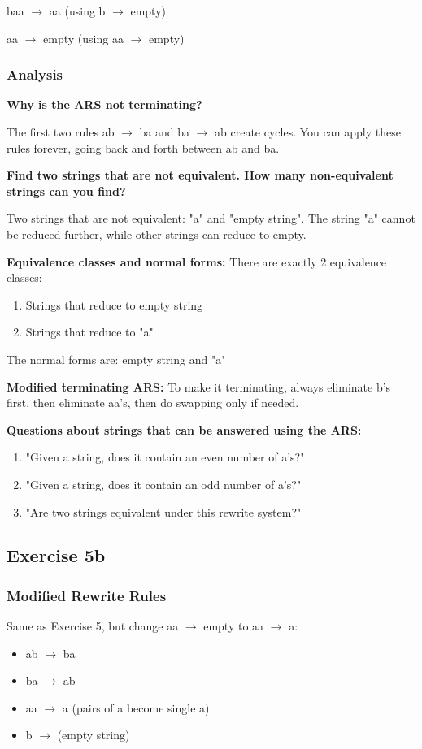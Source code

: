 \documentclass{article}
\theoremstyle{theorem}
\theoremstyle{definition}
\theoremstyle{remark}
\begin{document}
baa $\to$ aa (using b $\to$ empty)

aa $\to$ empty (using aa $\to$ empty)

\subsubsection{Analysis}
\textbf{Why is the ARS not terminating?}

The first two rules ab $\to$ ba and ba $\to$ ab create cycles. You can apply these rules forever, going back and forth between ab and ba.

\textbf{Find two strings that are not equivalent. How many non-equivalent strings can you find?}

Two strings that are not equivalent: "a" and "empty string". The string "a" cannot be reduced further, while other strings can reduce to empty.

\textbf{Equivalence classes and normal forms:}
There are exactly 2 equivalence classes:
\begin{enumerate}
\item Strings that reduce to empty string
\item Strings that reduce to "a"
\end{enumerate}

The normal forms are: empty string and "a"

\textbf{Modified terminating ARS:}
To make it terminating, always eliminate b's first, then eliminate aa's, then do swapping only if needed.

\textbf{Questions about strings that can be answered using the ARS:}
\begin{enumerate}
\item "Given a string, does it contain an even number of a's?"
\item "Given a string, does it contain an odd number of a's?"
\item "Are two strings equivalent under this rewrite system?"
\end{enumerate}

\subsection{Exercise 5b}
\subsubsection{Modified Rewrite Rules}
Same as Exercise 5, but change aa $\to$ empty to aa $\to$ a:
\begin{itemize}
\item ab $\to$ ba
\item ba $\to$ ab  
\item aa $\to$ a (pairs of a become single a)
\item b $\to$ (empty string)
\end{itemize}
\end{document}
